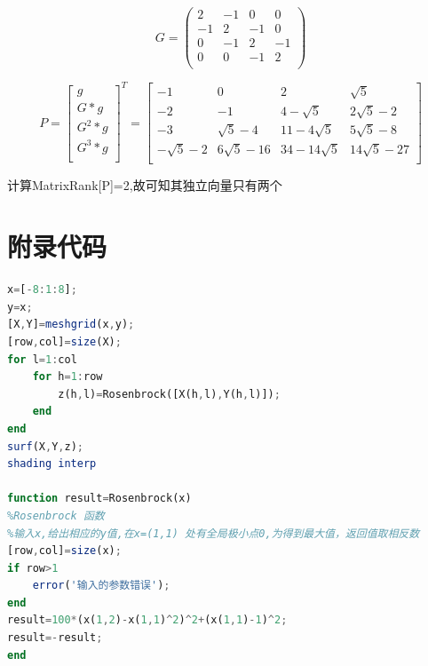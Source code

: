 \documentclass[UTF8]{ctexart}
\begin{document}
\begin{enumerate}
\[G=\left(
\begin{array}{cccc}
 2 & -1 & 0 & 0 \\
 -1 & 2 & -1 & 0 \\
 0 & -1 & 2 & -1 \\
 0 & 0 & -1 & 2 \\
\end{array}
\right)\]

\[P=\begin{bmatrix}
g\\
G*g\\
G^2*g\\
G^3*g\\
\end{bmatrix}^T=
\begin{bmatrix}
-1&0&2&\sqrt{5}\\
-2&-1&4-\sqrt{5}&2 \sqrt{5}-2\\
-3&\sqrt{5}-4&11-4 \sqrt{5}&5 \sqrt{5}-8\\
-\sqrt{5}-2&6 \sqrt{5}-16&34-14 \sqrt{5}&14 \sqrt{5}-27\\
\end{bmatrix}\]

计算MatrixRank[P]=2,故可知其独立向量只有两个
\end{enumerate}

\newpage
\section*{附录代码}
\begin{lstlisting}[language=Octave]
%绘制Rosenbrock函数图形
x=[-8:1:8];  
y=x;  
[X,Y]=meshgrid(x,y);  
[row,col]=size(X);  
for l=1:col  
    for h=1:row  
        z(h,l)=Rosenbrock([X(h,l),Y(h,l)]);  
    end  
end  
surf(X,Y,z);  
shading interp  

function result=Rosenbrock(x)  
%Rosenbrock 函数  
%输入x,给出相应的y值,在x=(1,1) 处有全局极小点0,为得到最大值，返回值取相反数   
[row,col]=size(x);  
if row>1  
    error('输入的参数错误');  
end  
result=100*(x(1,2)-x(1,1)^2)^2+(x(1,1)-1)^2;  
result=-result;  
end
\end{lstlisting}
\end{document}
